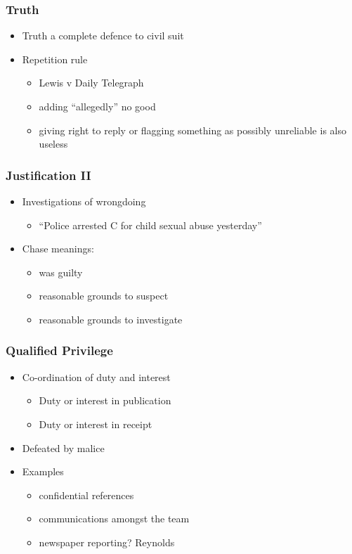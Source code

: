\documentclass[ignorenonframetext,]{beamer}
\begin{document}
\begin{frame}
\frametitle{Truth}

\begin{itemize}
\item  Truth a complete defence to civil suit
\item  Repetition rule

  \begin{itemize}
  \item    Lewis v Daily Telegraph
  \item    adding ``allegedly'' no good
  \item    giving right to reply or flagging something as possibly
    unreliable is also useless
  \end{itemize}
\end{itemize}
\end{frame}

\begin{frame}
\frametitle{Justification II}

\begin{itemize}
\item  Investigations of wrongdoing

  \begin{itemize}
  \item    ``Police arrested C for child sexual abuse yesterday''
  \end{itemize}
\item  {Chase} meanings:

  \begin{itemize}
  \item    was guilty
  \item    reasonable grounds to suspect
  \item    reasonable grounds to investigate
  \end{itemize}
\end{itemize}
\end{frame}

\begin{frame}
\frametitle{Qualified Privilege}

\begin{itemize}
\item  Co-ordination of duty and interest

  \begin{itemize}
  \item    Duty or interest in publication
  \item    Duty or interest in receipt
  \end{itemize}
\item  Defeated by {malice}
\item  Examples

  \begin{itemize}
  \item    confidential references
  \item    communications amongst the team
  \item    newspaper reporting? {Reynolds}
  \end{itemize}
\end{itemize}
\end{frame}
\end{document}
